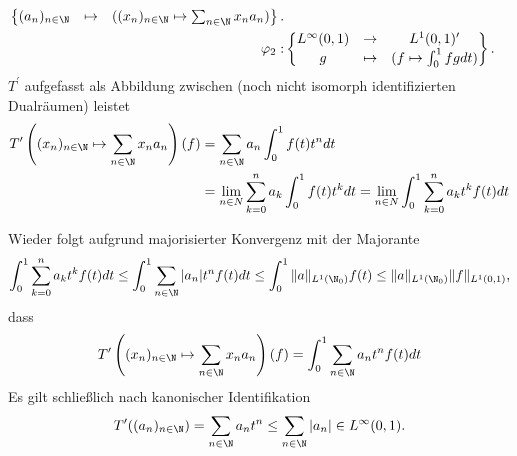 \begin{solution}
\begin{align*}
\begin{Bmatrix}
    (a_n)_{n \in \N} &\mapsto & ((x_n)_{n \in \N} \mapsto \sum_{n \in \N}x_na_n)
  \end{Bmatrix}. \\
  \varphi_2:& \begin{Bmatrix}
    L^\infty(0, 1) & \to & L^1(0, 1)^{\prime} \\
    g &\mapsto & (f \mapsto \int_0^1 fg dt)
  \end{Bmatrix}.
\end{align*}
$T^{\prime}$ aufgefasst als Abbildung zwischen (noch nicht isomorph identifizierten
Dualräumen) leistet
\begin{align*}
  T^{\prime}\left((x_n)_{n \in \N} \mapsto \sum_{n \in \N}x_na_n\right)(f)
  &= \sum_{n \in \N}a_n\int_0^1 f(t)t^n dt \\
  &= \lim_{n \in N} \sum_{k= 0}^n a_k \int_0^1 f(t)t^k dt
  = \lim_{n \in N}  \int_0^1\sum_{k= 0}^n a_k t^k f(t) dt
\end{align*}

Wieder folgt aufgrund majorisierter Konvergenz mit der Majorante
\begin{align*}
  \int_0^1 \sum_{k=0}^n a_kt^k f(t)dt \leq \int_0^1 \sum_{n \in \N} |a_n|t^nf(t) dt
  \leq \int_0^1 \|a\|_{L^1(\N_0)}f(t) \leq \|a\|_{L^1(\N_0)}\|f\|_{L^1(0,1)},
\end{align*}
dass
\begin{align*}
  T^{\prime}\left((x_n)_{n \in \N} \mapsto \sum_{n \in \N}x_na_n\right)(f)
  = \int_0^1\sum_{n \in \N} a_n t^nf(t) dt
\end{align*}
Es gilt schließlich nach kanonischer Identifikation
\begin{align*}
  T^{\prime}((a_n)_{n \in\N}) = \sum_{n \in \N}a_n t^n \leq \sum_{n \in \N}|a_n| \in L^\infty(0, 1).
\end{align*}
\end{solution}
